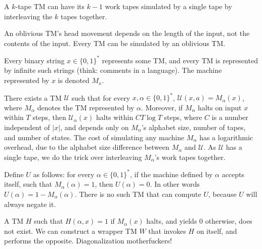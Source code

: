 \begin{note}
  A $k$-tape TM can have its $k - 1$ work tapes simulated by a single tape by
  interleaving the $k$ tapes together.
\end{note}

\begin{note}
  An oblivious TM's head movement depends on the length of the input, not
  the contents of the input.
  Every TM can be simulated by an oblivious TM.
\end{note}

\begin{note}
  Every binary string $x \in \{0, 1\}^\ast$ represents some TM, and every TM
  is represented by infinite such strings (think: comments in a language).
  The machine represented by $x$ is denoted $M_x$.
\end{note}

\begin{note}
  There exists a TM $\mathcal{U}$ such that for every
  $x, \alpha \in \{0, 1\}^\ast$, $\mathcal{U}(x, a) = M_\alpha (x)$, where
  $M_\alpha$ denotes the TM represented by $\alpha$.
  Moreover, if $M_\alpha$ halts on input $x$ within $T$ steps, then
  $\mathcal{U}_\alpha (x)$ halts within $C T \log T$ steps, where $C$ is
  a number independent of $|x|$, and depends only on $M_\alpha$'s alphabet
  size, number of tapes, and number of states.
  The cost of simulating any machine $M_\alpha$ has a
  logarithmic overhead, due to the alphabet size difference between
  $M_\alpha$ and $\mathcal{U}$.
  As $\mathcal{U}$ has a single tape, we do the trick over interleaving
  $M_\alpha$'s work tapes together.
\end{note}

\begin{note}
  Define $U$ as follows: for every $\alpha \in \{0, 1\}^\ast$, if the machine
  defined by $\alpha$ accepts itself, such that $M_\alpha (\alpha) = 1$, then
  $U(\alpha) = 0$.
  In other words $U(\alpha) = 1 - M_\alpha (\alpha)$.
  There is no such TM that can compute $U$, because $U$ will always negate it.
\end{note}

\begin{note}
  A TM $H$ such that $H(\alpha, x) = 1$ if $M_\alpha (x)$ halts, and yields
  $0$ otherwise, does not exist.
  We can construct a wrapper TM $W$ that invokes $H$ on itself, and performs
  the opposite.
  Diagonalization motherfuckers!
\end{note}

